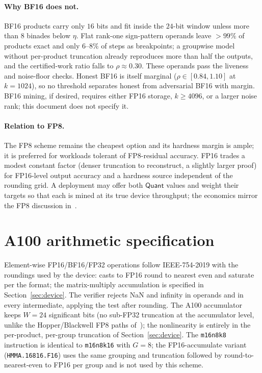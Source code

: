 \documentclass[11pt]{article}
\newcommand{\Quant}{\textsf{Quant}}
\newcommand{\FP}[1]{\textsf{FP#1}}
\begin{document}
\paragraph{Why \textsf{BF16} does not.} \textsf{BF16} products carry only $16$ bits and fit inside
the $24$-bit window unless more than $8$ binades below $\eta$. Flat rank-one sign-pattern operands
leave $>\!99\%$ of products exact and only $6\text{--}8\%$ of steps as breakpoints; a groupwise
model without per-product truncation already reproduces more than half the outputs, and the
certified-work ratio falls to $\rho\approx 0.30$. These operands pass the liveness and noise-floor
checks. Honest \textsf{BF16} is itself marginal ($\rho\in[0.84,1.10]$ at $k=1024$), so no
threshold separates honest from adversarial \textsf{BF16} with margin. \textsf{BF16} mining, if
desired, requires either \FP{16} storage, $k\ge 4096$, or a larger noise rank; this document does
not specify it.

\paragraph{Relation to \FP{8}.} The \FP{8} scheme remains the cheapest option and its hardness
margin is ample; it is preferred for workloads tolerant of \FP{8}-residual accuracy. \FP{16}
trades a modest constant factor (denser truncation to reconstruct, a slightly larger proof) for
\FP{16}-level output accuracy and a hardness source independent of the rounding grid. A deployment
may offer both $\Quant$ values and weight their targets so that each is mined at its true device
throughput; the economics mirror the \FP{8} discussion in~\cite{PearlFP8}.

\appendix

\section{A100 arithmetic specification}\label{app:arith}
Element-wise \FP{16}/\textsf{BF16}/\FP{32} operations follow IEEE-754-2019 with the roundings
used by the device: casts to \FP{16} round to nearest even and saturate per the format; the
matrix-multiply accumulation is specified in Section~\ref{sec:device}. The verifier rejects NaN
and infinity in operands and in every intermediate, applying the test after rounding. The A100
accumulator keeps $W=24$ significant bits (no sub-\FP{32} truncation at the accumulator level,
unlike the Hopper/Blackwell \FP{8} paths of~\cite{PearlFP8}); the nonlinearity is entirely in the
per-product, per-group truncation of Section~\ref{sec:device}. The \texttt{m16n8k8} instruction is
identical to \texttt{m16n8k16} with $G=8$; the \FP{16}-accumulate variant (\texttt{HMMA.16816.F16})
uses the same grouping and truncation followed by round-to-nearest-even to \FP{16} per group and is
not used by this scheme.
\end{document}
